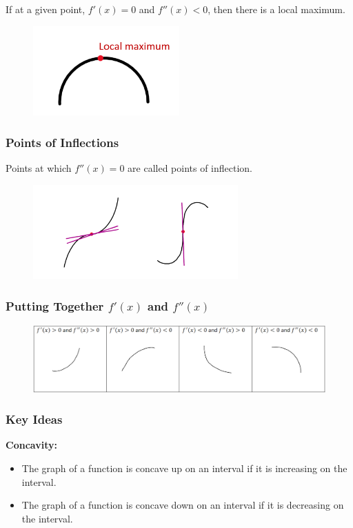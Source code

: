 \documentclass{article}
\begin{document}
If at a given point, $f'(x)=0$ and $f''(x)<0$, then there is a local maximum.
\begin{figure}[ht]
    \centering
    \includegraphics[width=0.5\textwidth]{imgs/local-maximum.png}
\end{figure}

\subsubsection{Points of Inflections}
Points at which $f''(x)=0$ are called points of inflection.
\begin{figure}[ht]
    \centering
    \includegraphics[width=0.7\textwidth]{imgs/points_of_inflections.png}
\end{figure}
\newpage 
\subsubsection{Putting Together $f'(x)$ and $f''(x)$}

\begin{figure}[h]
    \centering
    \includegraphics[width=1\textwidth]{imgs/putting_together.png}
\end{figure}
\subsubsection{Key Ideas}
\textbf{Concavity:}
\begin{itemize}
    \item The graph of a function is concave up on an interval if it is increasing on the interval.
    \item The graph of a function is concave down on an interval if it is decreasing on the interval.
\end{itemize}
\end{document}
